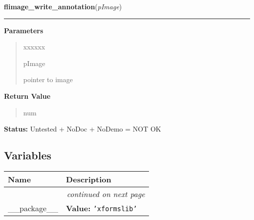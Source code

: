 \hspace{.8\funcindent}\begin{boxedminipage}{\funcwidth}

    \raggedright \textbf{flimage\_write\_annotation}(\textit{pImage})

    \vspace{-1.5ex}

    \rule{\textwidth}{0.5\fboxrule}
\setlength{\parskip}{2ex}
\setlength{\parskip}{1ex}
      \textbf{Parameters}
      \vspace{-1ex}

      \begin{quote}
        \begin{Ventry}{xxxxxx}

          \item[pImage]

          pointer to image

        \end{Ventry}

      \end{quote}

      \textbf{Return Value}
    \vspace{-1ex}

      \begin{quote}
      num

      \end{quote}

\textbf{Status:} Untested + NoDoc + NoDemo = NOT OK



    \end{boxedminipage}



  \subsection{Variables}

    \vspace{-1cm}
\hspace{\varindent}\begin{longtable}{|p{\varnamewidth}|p{\vardescrwidth}|l}
\cline{1-2}
\cline{1-2} \centering \textbf{Name} & \centering \textbf{Description}& \\
\cline{1-2}
\endhead\cline{1-2}\multicolumn{3}{r}{\small\textit{continued on next page}}\\\endfoot\cline{1-2}
\endlastfoot\raggedright \_\-\_\-p\-a\-c\-k\-a\-g\-e\-\_\-\_\- & \raggedright \textbf{Value:} 
{\tt \texttt{'}\texttt{xformslib}\texttt{'}}&\\
\cline{1-2}
\end{longtable}

